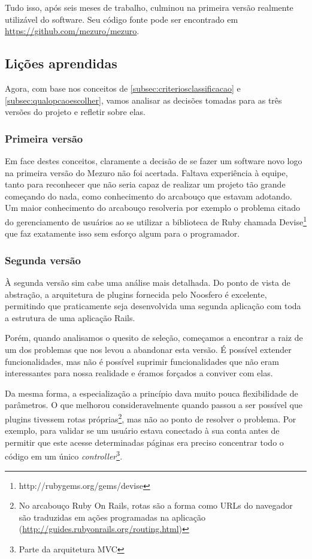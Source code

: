 \documentclass[12pt]{article}
\begin{document}
  Tudo isso, após seis meses de trabalho, culminou na primeira versão realmente utilizável do software. Seu código fonte pode ser encontrado em \url{https://github.com/mezuro/mezuro}.

  \subsection{Lições aprendidas} \label{subsec:licoes-aprendidas}
  Agora, com base nos conceitos de \ref{subsec:criteriosclassificacao} e \ref{subsec:qualopcaoescolher}, vamos analisar as decisões tomadas para as três versões do projeto e refletir sobre elas.

    \subsubsection{Primeira versão}
    Em face destes conceitos, claramente a decisão de se fazer um software novo logo na primeira versão do Mezuro não foi acertada. Faltava experiência à equipe, tanto para reconhecer que não seria capaz de realizar um projeto tão grande começando do nada, como conhecimento do arcabouço que estavam adotando. Um maior conhecimento do arcabouço resolveria por exemplo o problema citado do gerenciamento de usuários ao se utilizar a biblioteca de Ruby chamada Devise\footnote{http://rubygems.org/gems/devise} que faz exatamente isso sem esforço algum para o programador.

    \subsubsection{Segunda versão} \label{subsubsec:segundaversao}
    À segunda versão sim cabe uma análise mais detalhada. Do ponto de vista de abstração, a arquitetura de plugins fornecida pelo Noosfero é excelente, permitindo que praticamente seja desenvolvida uma segunda aplicação com toda a estrutura de uma aplicação Rails.

    Porém, quando analisamos o quesito de seleção, começamos a encontrar a raiz de um dos problemas que nos levou a abandonar esta versão. É possível extender funcionalidades, mas não é possível suprimir funcionalidades que não eram interessantes para nossa realidade e éramos forçados a conviver com elas.

    Da mesma forma, a especialização a princípio dava muito pouca flexibilidade de parâmetros. O que melhorou consideravelmente quando passou a ser possível que plugins tivessem rotas próprias\footnote{No arcabouço Ruby On Rails, rotas são a forma como URLs do navegador são traduzidas em ações programadas na aplicação (\url{http://guides.rubyonrails.org/routing.html})}, mas não ao ponto de resolver o problema. Por exemplo, para validar se um usuário estava conectado à sua conta antes de permitir que este acesse determinadas páginas era preciso concentrar todo o código em um único \textit{controller}\footnote{Parte da arquitetura MVC}.
\end{document}

